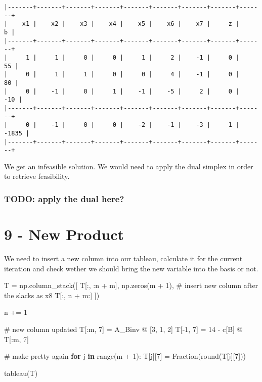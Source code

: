 \documentclass[
  letterpaper,
  DIV=11,
  numbers=noendperiod]{scrartcl}
\newenvironment{Shaded}{\begin{snugshade}}{\end{snugshade}}
\newcommand{\BuiltInTok}[1]{\textcolor[rgb]{0.00,0.23,0.31}{#1}}
\newcommand{\CommentTok}[1]{\textcolor[rgb]{0.37,0.37,0.37}{#1}}
\newcommand{\ControlFlowTok}[1]{\textcolor[rgb]{0.00,0.23,0.31}{\textbf{#1}}}
\newcommand{\DecValTok}[1]{\textcolor[rgb]{0.68,0.00,0.00}{#1}}
\newcommand{\KeywordTok}[1]{\textcolor[rgb]{0.00,0.23,0.31}{\textbf{#1}}}
\newcommand{\NormalTok}[1]{\textcolor[rgb]{0.00,0.23,0.31}{#1}}
\newcommand{\OperatorTok}[1]{\textcolor[rgb]{0.37,0.37,0.37}{#1}}
\begin{document}
\begin{verbatim}
|-------+-------+-------+-------+-------+-------+-------+-------+-------+
|    x1 |    x2 |    x3 |    x4 |    x5 |    x6 |    x7 |    -z |     b |
|-------+-------+-------+-------+-------+-------+-------+-------+-------+
|     1 |     1 |     0 |     0 |     1 |     2 |    -1 |     0 |    55 |
|     0 |     1 |     1 |     0 |     0 |     4 |    -1 |     0 |    80 |
|     0 |    -1 |     0 |     1 |    -1 |    -5 |     2 |     0 |   -10 |
|-------+-------+-------+-------+-------+-------+-------+-------+-------+
|     0 |    -1 |     0 |     0 |    -2 |    -1 |    -3 |     1 | -1835 |
|-------+-------+-------+-------+-------+-------+-------+-------+-------+
\end{verbatim}

We get an infeasible solution. We would need to apply the dual simplex
in order to retrieve feasibility.

\subsubsection{TODO: apply the dual
here?}\label{todo-apply-the-dual-here}

\newpage

\section{9 - New Product}\label{new-product}

We need to insert a new column into our tableau, calculate it for the
current iteration and check wether we should bring the new variable into
the basis or not.

\small

\begin{Shaded}
\begin{Highlighting}[]
\NormalTok{T }\OperatorTok{=}\NormalTok{ np.column\_stack([}
\NormalTok{    T[:, :n }\OperatorTok{+}\NormalTok{ m],}
\NormalTok{    np.zeros(m }\OperatorTok{+} \DecValTok{1}\NormalTok{), }\CommentTok{\# insert new column after the slacks as x8}
\NormalTok{    T[:, n }\OperatorTok{+}\NormalTok{ m:]}
\NormalTok{])}

\NormalTok{n }\OperatorTok{+=} \DecValTok{1}

\CommentTok{\# new column updated}
\NormalTok{T[:m, }\DecValTok{7}\NormalTok{] }\OperatorTok{=}\NormalTok{ A\_Binv }\OperatorTok{@}\NormalTok{ [}\DecValTok{3}\NormalTok{, }\DecValTok{1}\NormalTok{, }\DecValTok{2}\NormalTok{]}
\NormalTok{T[}\OperatorTok{{-}}\DecValTok{1}\NormalTok{, }\DecValTok{7}\NormalTok{] }\OperatorTok{=} \DecValTok{14} \OperatorTok{{-}}\NormalTok{ c[B] }\OperatorTok{@}\NormalTok{ T[:m, }\DecValTok{7}\NormalTok{]}

\CommentTok{\# make pretty again}
\ControlFlowTok{for}\NormalTok{ j }\KeywordTok{in} \BuiltInTok{range}\NormalTok{(m }\OperatorTok{+} \DecValTok{1}\NormalTok{):}
\NormalTok{    T[j][}\DecValTok{7}\NormalTok{] }\OperatorTok{=}\NormalTok{ Fraction(}\BuiltInTok{round}\NormalTok{(T[j][}\DecValTok{7}\NormalTok{]))}

\NormalTok{tableau(T)}
\end{Highlighting}
\end{Shaded}
\end{document}
